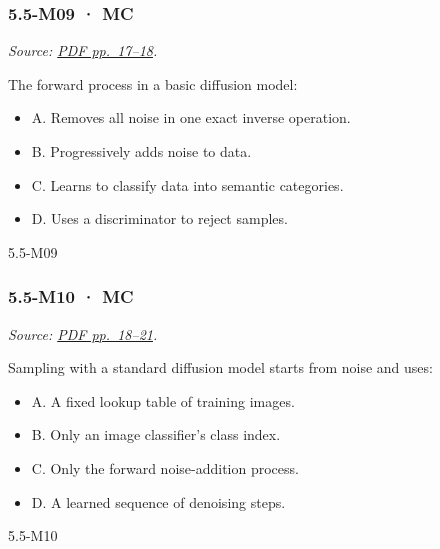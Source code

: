 \noindent\begin{minipage}{\linewidth}

\subsubsection{5.5-M09 · MC}\label{m09-mc-16}

\emph{Source:
\href{../Lecture\%20Slides/5.5.\%20Generative\%20Models.pdf\#page=17}{PDF
pp.~17--18}.}

The forward process in a basic diffusion model:

\begin{itemize}
\tightlist
\item
  A. Removes all noise in one exact inverse operation.
\item
  B. Progressively adds noise to data.
\item
  C. Learns to classify data into semantic categories.
\item
  D. Uses a discriminator to reject samples.
\end{itemize}

\begin{solution}[8mm]{5.5-M09}

\end{solution}
\end{minipage}\par\medskip

\noindent\begin{minipage}{\linewidth}

\subsubsection{5.5-M10 · MC}\label{m10-mc-16}

\emph{Source:
\href{../Lecture\%20Slides/5.5.\%20Generative\%20Models.pdf\#page=18}{PDF
pp.~18--21}.}

Sampling with a standard diffusion model starts from noise and uses:

\begin{itemize}
\tightlist
\item
  A. A fixed lookup table of training images.
\item
  B. Only an image classifier's class index.
\item
  C. Only the forward noise-addition process.
\item
  D. A learned sequence of denoising steps.
\end{itemize}

\begin{solution}[8mm]{5.5-M10}

\end{solution}
\end{minipage}\par\medskip

